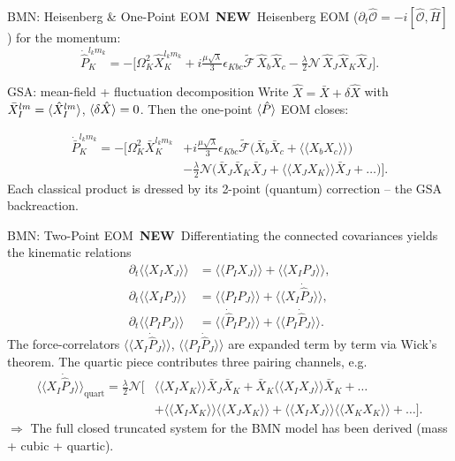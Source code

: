 \documentclass{beamer}
\newcommand{\newflag}{\hfill{\footnotesize\colorbox{metugold}{\color{white}\bfseries\,NEW\,}}}
\newcommand{\dbk}[1]{\langle\langle #1 \rangle\rangle}
\begin{document}
\begin{frame}{BMN: Heisenberg \& One-Point EOM \newflag}
  Heisenberg EOM ($\partial_t\hat{\mathcal{O}}=-i[\hat{\mathcal{O}},\hat H]$) for the momentum:
  {\footnotesize
  \begin{equation*}
    \dot{\hat P}_K^{l_km_k}=-\Big[\Omega_K^2\hat X_K^{l_km_k}
      +i\tfrac{\mu\sqrt\lambda}{3}\epsilon_{Kbc}\widetilde{\mathcal{F}}\,\hat X_b\hat X_c
      -\tfrac{\lambda}{2}\mathcal{N}\,\hat X_J\hat X_K\hat X_J\Big].
  \end{equation*}}
  \begin{block}{GSA: mean-field + fluctuation decomposition}
    Write $\hat X=\bar X+\delta\hat X$ with $\bar X_I^{lm}=\braket{\hat X_I^{lm}}$, $\braket{\delta\hat X}=0$. Then the one-point $\braket{\hat P}$ EOM closes:
  \end{block}
  {\footnotesize
  \begin{align*}
    \dot{\bar P}_K^{l_km_k}=-\Big[\Omega_K^2\bar X_K^{l_km_k}
      &+i\tfrac{\mu\sqrt\lambda}{3}\epsilon_{Kbc}\widetilde{\mathcal{F}}\big(\bar X_b\bar X_c+\dbk{X_bX_c}\big)\\
      &-\tfrac{\lambda}{2}\mathcal{N}\big(\bar X_J\bar X_K\bar X_J+\dbk{X_JX_K}\bar X_J+\dots\big)\Big].
  \end{align*}}
  \vspace{-0.4em}
  {\footnotesize Each classical product is dressed by its 2-point (quantum) correction -- the GSA backreaction.}
\end{frame}

\begin{frame}{BMN: Two-Point EOM \newflag}
  Differentiating the connected covariances yields the kinematic relations
  {\small
  \begin{align*}
    \partial_t\dbk{X_I X_J} &= \dbk{P_I X_J}+\dbk{X_I P_J},\\
    \partial_t\dbk{X_I P_J} &= \dbk{P_I P_J}+\dbk{X_I\dot{\hat P}_J},\\
    \partial_t\dbk{P_I P_J} &= \dbk{\dot{\hat P}_I P_J}+\dbk{P_I\dot{\hat P}_J}.
  \end{align*}}
  The force-correlators $\dbk{X_I\dot{\hat P}_J}$, $\dbk{P_I\dot{\hat P}_J}$ are expanded term by term via Wick's theorem. The quartic piece contributes three pairing channels, e.g.
  {\footnotesize
  \begin{align*}
    \dbk{X_I\dot{\hat P}_J}_{\text{quart}}=\tfrac{\lambda}{2}\mathcal{N}\Big[
      &\dbk{X_IX_K}\bar X_J\bar X_K+\bar X_K\dbk{X_IX_J}\bar X_K+\dots\\
      &+\dbk{X_IX_K}\dbk{X_JX_K}+\dbk{X_IX_J}\dbk{X_KX_K}+\dots\Big].
  \end{align*}}
  \vspace{-0.5em}
  {\footnotesize $\Rightarrow$ The full closed truncated system for the BMN model has been derived (mass + cubic + quartic).}
\end{frame}
\end{document}
